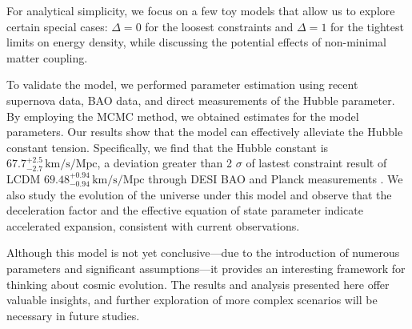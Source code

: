 \documentclass[a4paper,fleqn]{cas-sc}
\begin{document}
For analytical simplicity, we focus on a few toy models that allow us to explore certain special cases: $\Delta=0$ for the loosest constraints and $\Delta=1$ for the tightest limits on energy density, while discussing the potential effects of non-minimal matter coupling.

To validate the model, we performed parameter estimation using recent supernova data, BAO data, and direct measurements of the Hubble parameter. By employing the MCMC method, we obtained estimates for the model parameters. Our results show that the model can effectively alleviate the Hubble constant tension. Specifically, we find that the Hubble constant is $67.7^{+2.5}_{-2.7}\, \text{km/s/Mpc}$, a deviation greater than 2 $\sigma$ of lastest constraint result of LCDM $69.48^{+0.94}_{-0.94}\, \text{km/s/Mpc}$ through DESI BAO and Planck measurements \cite{pogosian2024consistencytestcosmologicalmodel}. We also study the evolution of the universe under this model and observe that the deceleration factor and the effective equation of state parameter indicate accelerated expansion, consistent with current observations.

Although this model is not yet conclusive—due to the introduction of numerous parameters and significant assumptions—it provides an interesting framework for thinking about cosmic evolution. The results and analysis presented here offer valuable insights, and further exploration of more complex scenarios will be necessary in future studies.






\end{document}

